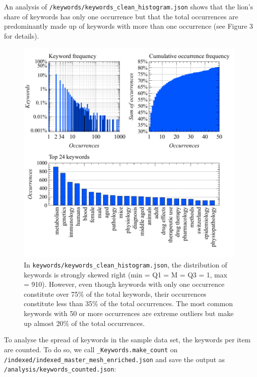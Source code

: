 An analysis of \texttt{/keywords/keywords\_clean\_histogram.json} shows
that the lion's share of keywords has only one occurrence but that the
total occurrences are predominantly made up of keywords with more than
one occurrence (see Figure 3 for details).

\begin{figure}
\centering
\includegraphics{images/keywords_clean_histogram_abc.pdf}
\caption{In \texttt{keywords/keywords\_clean\_histogram.json}, the
distribution of keywords is strongly skewed right (min = Q1 = M = Q3 =
1, max = 910). However, even though keywords with only one occurrence
constitute over 75\% of the total keywords, their occurrences constitute
less than 35\% of the total occurrences. The most common keywords with
50 or more occurrences are extreme outliers but make up almost 20\% of
the total occurrences.}
\end{figure}

To analyse the spread of keywords in the sample data set, the keywords
per item are counted. To do so, we call \texttt{\_Keywords.make\_count}
on \texttt{/indexed/indexed\_master\_mesh\_enriched.json} and save the
output as \texttt{/analysis/keywords\_counted.json}:

\begin{Shaded}
\begin{Highlighting}[]
\OperatorTok{=}\OperatorTok{+} \NormalTok{)}
\OperatorTok{=}
\OperatorTok{+} \NormalTok{)}
\end{Highlighting}
\end{Shaded}

